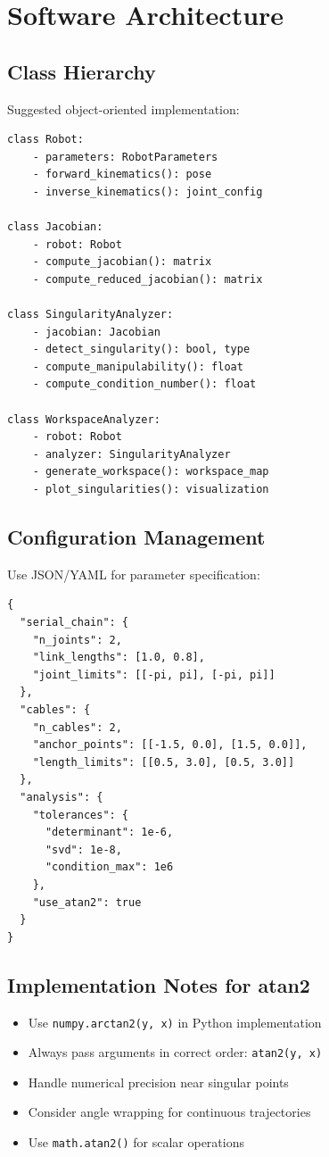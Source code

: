 \documentclass[11pt,a4paper]{article}
\begin{document}
\section{Software Architecture}

\subsection{Class Hierarchy}
Suggested object-oriented implementation:
\begin{verbatim}
class Robot:
    - parameters: RobotParameters
    - forward_kinematics(): pose
    - inverse_kinematics(): joint_config
    
class Jacobian:
    - robot: Robot  
    - compute_jacobian(): matrix
    - compute_reduced_jacobian(): matrix
    
class SingularityAnalyzer:
    - jacobian: Jacobian
    - detect_singularity(): bool, type
    - compute_manipulability(): float
    - compute_condition_number(): float
    
class WorkspaceAnalyzer:
    - robot: Robot
    - analyzer: SingularityAnalyzer
    - generate_workspace(): workspace_map
    - plot_singularities(): visualization
\end{verbatim}

\subsection{Configuration Management}
Use JSON/YAML for parameter specification:
\begin{verbatim}
{
  "serial_chain": {
    "n_joints": 2,
    "link_lengths": [1.0, 0.8],
    "joint_limits": [[-pi, pi], [-pi, pi]]
  },
  "cables": {
    "n_cables": 2,
    "anchor_points": [[-1.5, 0.0], [1.5, 0.0]],
    "length_limits": [[0.5, 3.0], [0.5, 3.0]]
  },
  "analysis": {
    "tolerances": {
      "determinant": 1e-6,
      "svd": 1e-8,
      "condition_max": 1e6
    },
    "use_atan2": true
  }
}
\end{verbatim}

\subsection{Implementation Notes for atan2}
\begin{itemize}
    \item Use \texttt{numpy.arctan2(y, x)} in Python implementation
    \item Always pass arguments in correct order: \texttt{atan2(y, x)}
    \item Handle numerical precision near singular points
    \item Consider angle wrapping for continuous trajectories
    \item Use \texttt{math.atan2()} for scalar operations
\end{itemize}
\end{document}
